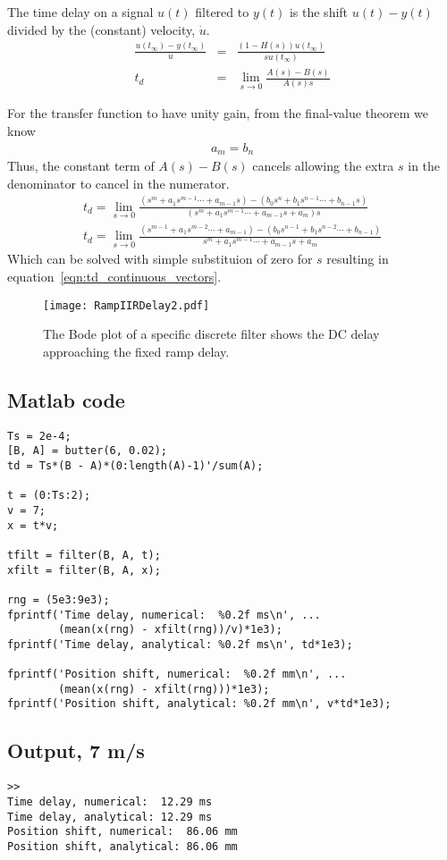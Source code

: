 \documentclass[10pt,letterpaper]{article}
\begin{document}
The time delay on a signal $u(t)$ filtered to $y(t)$ is the shift $u(t)-y(t)$ divided by the (constant) velocity, $\dot{u}$.
\begin{eqnarray}
\frac{u(t_\infty) - y(t_\infty)}{\dot{u}} &=& 
\frac{\left(1 - H(s)\right)u(t_\infty)}{su(t_\infty)}\\
t_d &=& \lim_{s\rightarrow0}\frac{A(s) - B(s)}{A(s)s}
\end{eqnarray}
 
For the transfer function to have unity gain, from the final-value theorem we know
\begin{eqnarray}
a_m=b_n
\end{eqnarray}
Thus, the constant term of $A(s)-B(s)$ cancels allowing the extra $s$ in the denominator to cancel in the numerator.
\begin{eqnarray}
t_d = \lim_{s\rightarrow0}
\frac{\left(s^m + a_1s^{m-1}\cdots + a_{m-1}s\right) - \left(b_0s^n + b_1s^{n-1}\cdots + b_{n-1}s\right)}
{\left(s^m + a_1s^{m-1}\cdots + a_{m-1}s + a_m\right)s}\\
t_d = \lim_{s\rightarrow0}
\frac{\left(s^{m-1} + a_1s^{m-2}\cdots + a_{m-1}\right) - \left(b_0s^{n-1} + b_1s^{n-2}\cdots + b_{n-1}\right)}
{s^m + a_1s^{m-1}\cdots + a_{m-1}s + a_m}
\end{eqnarray}
Which can be solved with simple substituion of zero for $s$ resulting in equation~\ref{eqn:td_continuous_vectors}.

\begin{figure}
\centering
\texttt{[image: RampIIRDelay2.pdf]}
\caption{The Bode plot of a specific discrete filter shows the DC delay approaching the fixed ramp delay.}
\label{fig:Bode}
\end{figure}


\newpage
\subsection*{Matlab code}
\begin{verbatim}
Ts = 2e-4;
[B, A] = butter(6, 0.02);
td = Ts*(B - A)*(0:length(A)-1)'/sum(A);

t = (0:Ts:2);
v = 7;
x = t*v;

tfilt = filter(B, A, t);
xfilt = filter(B, A, x);

rng = (5e3:9e3);
fprintf('Time delay, numerical:  %0.2f ms\n', ...
        (mean(x(rng) - xfilt(rng))/v)*1e3);
fprintf('Time delay, analytical: %0.2f ms\n', td*1e3);

fprintf('Position shift, numerical:  %0.2f mm\n', ...
        (mean(x(rng) - xfilt(rng)))*1e3);
fprintf('Position shift, analytical: %0.2f mm\n', v*td*1e3);
\end{verbatim}
\subsection*{Output, 7 m/s}
\begin{verbatim}
>>
Time delay, numerical:  12.29 ms
Time delay, analytical: 12.29 ms
Position shift, numerical:  86.06 mm
Position shift, analytical: 86.06 mm
\end{verbatim}
\end{document}
